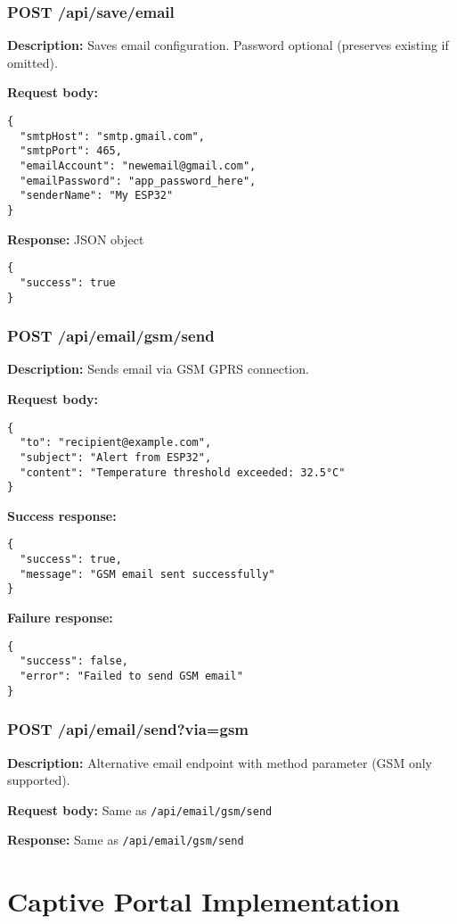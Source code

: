 \documentclass[11pt,a4paper]{article}
\begin{document}
\subsubsection{POST /api/save/email}
\textbf{Description:} Saves email configuration. Password optional (preserves existing if omitted).

\textbf{Request body:}
\begin{verbatim}
{
  "smtpHost": "smtp.gmail.com",
  "smtpPort": 465,
  "emailAccount": "newemail@gmail.com",
  "emailPassword": "app_password_here",
  "senderName": "My ESP32"
}
\end{verbatim}

\textbf{Response:} JSON object
\begin{verbatim}
{
  "success": true
}
\end{verbatim}

\subsubsection{POST /api/email/gsm/send}
\textbf{Description:} Sends email via GSM GPRS connection.

\textbf{Request body:}
\begin{verbatim}
{
  "to": "recipient@example.com",
  "subject": "Alert from ESP32",
  "content": "Temperature threshold exceeded: 32.5°C"
}
\end{verbatim}

\textbf{Success response:}
\begin{verbatim}
{
  "success": true,
  "message": "GSM email sent successfully"
}
\end{verbatim}

\textbf{Failure response:}
\begin{verbatim}
{
  "success": false,
  "error": "Failed to send GSM email"
}
\end{verbatim}

\subsubsection{POST /api/email/send?via=gsm}
\textbf{Description:} Alternative email endpoint with method parameter (GSM only supported).

\textbf{Request body:} Same as \texttt{/api/email/gsm/send}

\textbf{Response:} Same as \texttt{/api/email/gsm/send}

\section{Captive Portal Implementation}
\end{document}
